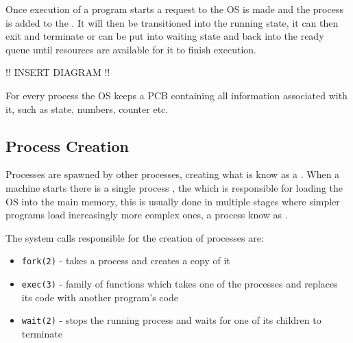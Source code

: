 
		\par{Once execution of a program starts a request to the OS is made and the process is added to the . It will then be transitioned into the running state, it can then exit and terminate or can be put into waiting state and back into the ready queue until resources are available for it to finish execution.}

	!! INSERT DIAGRAM !!


		\par{For every process the OS keeps a PCB containing all information associated with it, such as state, numbers, counter etc.}

\subsection{Process Creation}





	\par{Processes are spawned by other processes, creating what is know as a . When a machine starts there is a single process , the  which is responsible for loading the OS into the main memory, this is usually done in multiple stages where simpler programs load increasingly more complex ones, a process know as .}
	\par{The system calls responsible for the creation of processes are:}

		\begin{itemize}
			\item[] \texttt{fork(2)} - takes a process and creates a copy of it
			\item[] \texttt{exec(3)} - family of functions which takes one of the processes and replaces its code with another program's code
			\item[] \texttt{wait(2)} - stops the running process and waits for one of its children to terminate
		\end{itemize}

